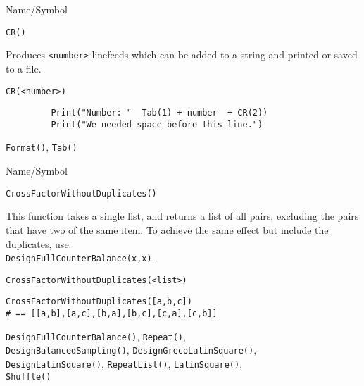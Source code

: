 \begin{desc}{Name/Symbol}

\item[Name/Symbol] \verb+CR()+

\item[Description]  Produces \verb+<number>+ linefeeds which can be added to a
  string and printed or saved to a file.

\item[Usage]        \verb!CR(<number>)!

\item[Example]     
\begin{verbatim}
         Print("Number: "  Tab(1) + number  + CR(2))
         Print("We needed space before this line.")
\end{verbatim}
\item[See Also]
\verb+Format()+, \verb+Tab()+
\end{desc}






\begin{desc}{Name/Symbol}
\item[Name/Symbol]  	\verb+CrossFactorWithoutDuplicates()+

\item[Description] 	This function takes a single list, and returns a list of all 
			pairs, excluding the pairs that have two of the same item. 
			To achieve the same effect but include the duplicates, use: \\
			\verb+DesignFullCounterBalance(x,x)+.

\item[Usage]
\begin{verbatim}
CrossFactorWithoutDuplicates(<list>)
\end{verbatim}

\item[Example]
\begin{verbatim}
CrossFactorWithoutDuplicates([a,b,c]) 
# == [[a,b],[a,c],[b,a],[b,c],[c,a],[c,b]]
\end{verbatim}

\item[See Also] \verb+DesignFullCounterBalance()+, \verb+Repeat()+,\\ \verb+DesignBalancedSampling()+,
 \verb+DesignGrecoLatinSquare()+,\\
  \verb+DesignLatinSquare()+,  \verb+RepeatList()+, 
  \verb+LatinSquare()+,\\ \verb+Shuffle()+
\end{desc}



